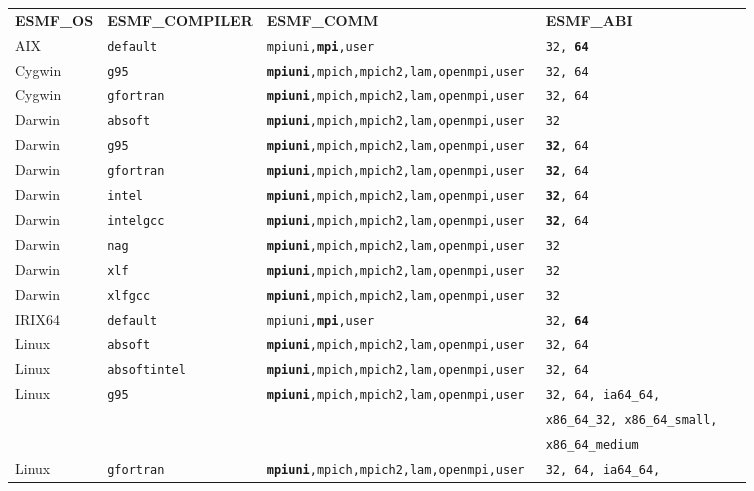 \begin{tabular}{lllll}
  {\bfseries\footnotesize ESMF\_OS} &{\bfseries\footnotesize ESMF\_COMPILER} & {\bfseries\footnotesize ESMF\_COMM} & {\bfseries\footnotesize ESMF\_ABI} \\

AIX     &\tt default     &\tt mpiuni,{\bf mpi},user      &\tt 32, {\bf 64} \\
Cygwin  &\tt g95         &\tt {\bf mpiuni},mpich,mpich2,lam,openmpi,user &\tt 32, 64 \\
Cygwin  &\tt gfortran    &\tt {\bf mpiuni},mpich,mpich2,lam,openmpi,user &\tt 32, 64 \\
Darwin  &\tt absoft      &\tt {\bf mpiuni},mpich,mpich2,lam,openmpi,user &\tt 32 \\
Darwin  &\tt g95         &\tt {\bf mpiuni},mpich,mpich2,lam,openmpi,user &\tt {\bf 32}, 64 \\
Darwin  &\tt gfortran    &\tt {\bf mpiuni},mpich,mpich2,lam,openmpi,user &\tt {\bf 32}, 64 \\
Darwin  &\tt intel       &\tt {\bf mpiuni},mpich,mpich2,lam,openmpi,user &\tt {\bf 32}, 64 \\
Darwin  &\tt intelgcc    &\tt {\bf mpiuni},mpich,mpich2,lam,openmpi,user &\tt {\bf 32}, 64 \\
Darwin  &\tt nag         &\tt {\bf mpiuni},mpich,mpich2,lam,openmpi,user &\tt 32 \\
Darwin  &\tt xlf         &\tt {\bf mpiuni},mpich,mpich2,lam,openmpi,user &\tt 32 \\
Darwin  &\tt xlfgcc      &\tt {\bf mpiuni},mpich,mpich2,lam,openmpi,user &\tt 32 \\
IRIX64  &\tt default     &\tt mpiuni,{\bf mpi},user     &\tt 32, {\bf 64} \\
Linux   &\tt absoft      &\tt {\bf mpiuni},mpich,mpich2,lam,openmpi,user &\tt 32, 64 \\
Linux   &\tt absoftintel &\tt {\bf mpiuni},mpich,mpich2,lam,openmpi,user &\tt 32, 64  \\
Linux   &\tt g95         &\tt {\bf mpiuni},mpich,mpich2,lam,openmpi,user &\tt 32, 64, ia64\_64, \\
        &                &                              &\tt x86\_64\_32, x86\_64\_small, \\
        &                &                              &\tt x86\_64\_medium \\
Linux   &\tt gfortran    &\tt {\bf mpiuni},mpich,mpich2,lam,openmpi,user &\tt 32, 64, ia64\_64, \\

\end{tabular}
